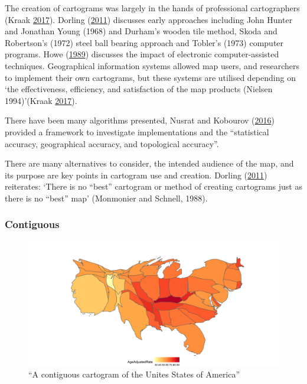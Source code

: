 \documentclass[11pt,]{article}
\begin{document}
The creation of cartograms was largely in the hands of professional
cartographers (Kraak \protect\hyperlink{ref-CD}{2017}). Dorling
(\protect\hyperlink{ref-ACTUC}{2011}) discusses early approaches
including John Hunter and Jonathan Young (1968) and Durham's wooden tile
method, Skoda and Robertson's (1972) steel ball bearing approach and
Tobler's (1973) computer programs. Howe
(\protect\hyperlink{ref-HEDP}{1989}) discusses the impact of electronic
computer-assisted techniques. Geographical information systems allowed
map users, and researchers to implement their own cartograms, but these
systems are utilised depending on `the effectiveness, efficiency, and
satisfaction of the map products (Nielsen 1994)'(Kraak
\protect\hyperlink{ref-CD}{2017}).

There have been many algorithms presented, Nusrat and Kobourov
(\protect\hyperlink{ref-SAIC}{2016}) provided a framework to investigate
implementations and the ``statistical accuracy, geographical accuracy,
and topological accuracy''.

There are many alternatives to consider, the intended audience of the
map, and its purpose are key points in cartogram use and creation.
Dorling (\protect\hyperlink{ref-ACTUC}{2011}) reiterates: `There is no
``best'' cartogram or method of creating cartograms just as there is no
``best'' map' (Monmonier and Schnell, 1988).

\hypertarget{contiguous}{%
\subsubsection{Contiguous}\label{contiguous}}

\begin{figure}
\centering
\includegraphics{figures/ggcont.png}
\caption{``A contiguous cartogram of the Unites States of America''}
\end{figure}
\end{document}
